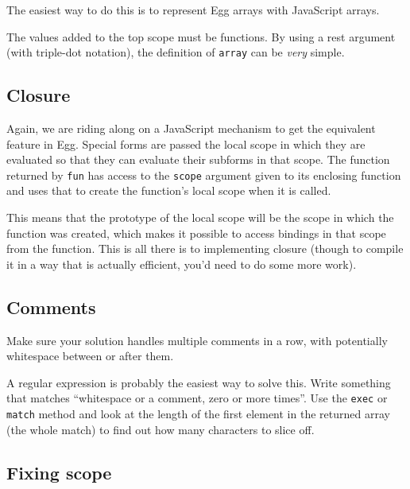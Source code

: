 The easiest way to do this is to represent Egg arrays with JavaScript arrays.

The values added to the top scope must be functions. By using a rest argument (with triple-dot notation), the definition of \lstinline`array` can be \emph{very} simple.

\subsection{Closure}

Again, we are riding along on a JavaScript mechanism to get the equivalent feature in Egg. Special forms are passed the local scope in which they are evaluated so that they can evaluate their subforms in that scope. The function returned by \lstinline`fun` has access to the \lstinline`scope` argument given to its enclosing function and uses that to create the function's local scope when it is called.

This means that the prototype of the local scope will be the scope in which the function was created, which makes it possible to access bindings in that scope from the function. This is all there is to implementing closure (though to compile it in a way that is actually efficient, you'd need to do some more work).

\subsection{Comments}

Make sure your solution handles multiple comments in a row, with potentially whitespace between or after them.

A regular expression is probably the easiest way to solve this. Write something that matches ``whitespace or a comment, zero or more times''. Use the \lstinline`exec` or \lstinline`match` method and look at the length of the first element in the returned array (the whole match) to find out how many characters to slice off.

\subsection{Fixing scope}

